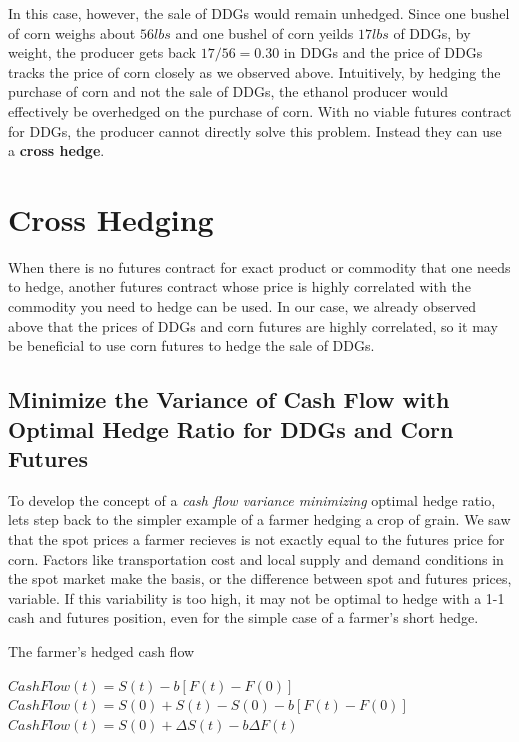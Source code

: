 \documentclass[
  letterpaper,
  DIV=11,
  numbers=noendperiod]{scrreprt}
\begin{document}
In this case, however, the sale of DDGs would remain unhedged. Since one
bushel of corn weighs about \(56lbs\) and one bushel of corn yeilds
\(17lbs\) of DDGs, by weight, the producer gets back \(17/56 = 0.30\) in
DDGs and the price of DDGs tracks the price of corn closely as we
observed above. Intuitively, by hedging the purchase of corn and not the
sale of DDGs, the ethanol producer would effectively be overhedged on
the purchase of corn. With no viable futures contract for DDGs, the
producer cannot directly solve this problem. Instead they can use a
\textbf{cross hedge}.

\hypertarget{cross-hedging}{%
\section{Cross Hedging}\label{cross-hedging}}

When there is no futures contract for exact product or commodity that
one needs to hedge, another futures contract whose price is highly
correlated with the commodity you need to hedge can be used. In our
case, we already observed above that the prices of DDGs and corn futures
are highly correlated, so it may be beneficial to use corn futures to
hedge the sale of DDGs.

\hypertarget{minimize-the-variance-of-cash-flow-with-optimal-hedge-ratio-for-ddgs-and-corn-futures}{%
\subsection{Minimize the Variance of Cash Flow with Optimal Hedge Ratio
for DDGs and Corn
Futures}\label{minimize-the-variance-of-cash-flow-with-optimal-hedge-ratio-for-ddgs-and-corn-futures}}

To develop the concept of a \emph{cash flow variance minimizing} optimal
hedge ratio, lets step back to the simpler example of a farmer hedging a
crop of grain. We saw that the spot prices a farmer recieves is not
exactly equal to the futures price for corn. Factors like transportation
cost and local supply and demand conditions in the spot market make the
basis, or the difference between spot and futures prices, variable. If
this variability is too high, it may not be optimal to hedge with a 1-1
cash and futures position, even for the simple case of a farmer's short
hedge.

The farmer's hedged cash flow

\(CashFlow(t) = S(t) - b[F(t) - F(0)]\)\\
\(CashFlow(t) = S(0) + S(t) - S(0) - b[F(t) - F(0)]\)\\
\(CashFlow(t) = S(0) + \Delta S(t) - b\Delta F(t)\)
\end{document}
